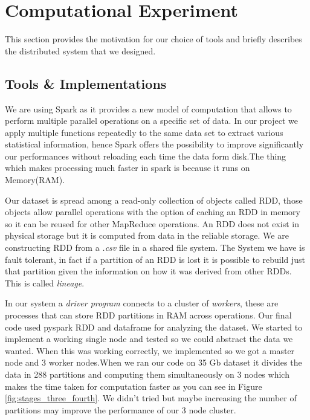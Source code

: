 \section{Computational Experiment}


This section provides the motivation for our choice of tools and briefly describes the distributed system that we designed. 

\subsection{Tools \& Implementations}
We are using Spark as it provides a new model of computation that allows to perform multiple parallel operations on a specific set of data. In our project we apply multiple functions repeatedly to the same data set to extract various statistical information, hence Spark offers the possibility to improve significantly our performances without reloading each time the data form disk\cite{Sparkzaharia}.The thing which makes processing much faster in spark is because it runs on Memory(RAM).

Our dataset is spread among a read-only collection of objects called RDD, those objects allow parallel operations with the option of caching an RDD in memory so it can be reused for other MapReduce operations. An RDD does not exist in physical storage but it is computed from data in the reliable storage. 
We are constructing RDD from a \textit{.csv} file in a shared file system. The System we have is fault tolerant, in fact if a partition of an RDD is lost it is possible to rebuild just that partition given the information on how it was derived from other RDDs. This is called \textit{lineage}\cite{Sparkzaharia}.

In our system a \textit{driver program} connects to a cluster of \textit{workers}, these are processes that can store RDD partitions in RAM across operations\cite{RDD}.\newline
Our final code used pyspark RDD and dataframe for analyzing the dataset. We started to implement a working single node and tested so we could abstract the data we wanted. When this was working correctly, we implemented so we got a master node and 3 worker nodes.When we ran our code on 35 Gb dataset it divides the data in 288 partitions and computing them simultaneously on 3 nodes which makes the time taken for computation faster as you can see in Figure \ref{fig:stages_three_fourth}. We didn't tried but maybe increasing the number of partitions may improve the performance of our 3 node cluster. 

